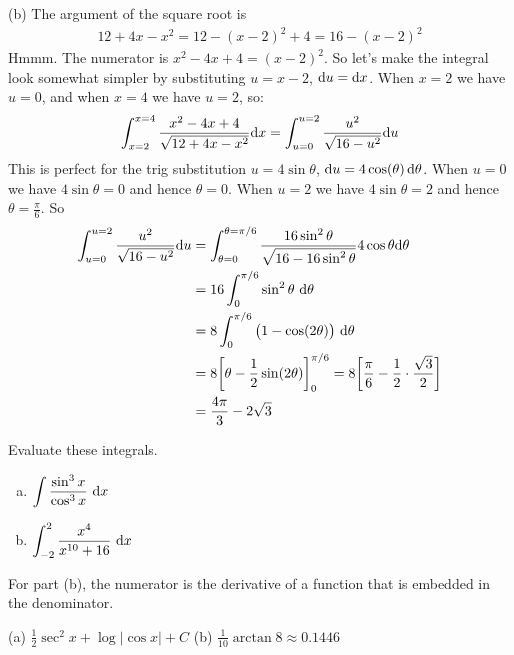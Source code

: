 \begin{solution}
\noindent (b)  The argument of the square root is
\begin{align*}
12+4x-x^2
=12-(x-2)^2 +4
=16-(x-2)^2
\end{align*}
Hmmm. The numerator is $x^2-4x+4=(x-2)^2$. So let's make the integral look somewhat simpler by substituting $u=x-2$, $\mathrm{d}u=\mathrm{d}x$.
When $x=2$ we have $u=0$, and when $x=4$ we have $u=2$, so:
\begin{align*}
\int_{x=2}^{x=4} \frac{x^2-4x+4}{\sqrt{12+4x-x^2}} \mathrm{d}x
=\int_{u=0}^{u=2} \frac{u^2}{\sqrt{16-u^2}} \mathrm{d}u
\end{align*}
This is perfect for the trig substitution $u=4\sin\theta$,
$\mathrm{d}u = 4\cos(\theta)\,\mathrm{d}\theta$. When $u=0$ we have $4\sin\theta = 0$
and hence $\theta=0$. When $u=2$ we have $4\sin\theta = 2$
and hence $\theta=\frac{\pi}{6}$. So
\begin{align*}
\int_{u=0}^{u=2} \frac{u^2}{\sqrt{16-u^2}} \mathrm{d}u
&=\int_{\theta=0}^{\theta=\pi/6}
      \frac{16\sin^2\theta}{\sqrt{16-16\sin^2\theta}}
              4\cos\theta\mathrm{d}\theta \\
&=16\int_{0}^{\pi/6} \sin^2\theta\ \mathrm{d}\theta \\
&=8\int_{0}^{\pi/6} \big(1-\cos(2\theta)\big)\ \mathrm{d}\theta \\
&=8 \bigg[\theta-\frac{1}{2}\sin(2\theta)\bigg]_{0}^{\pi/6}
 =8 \bigg[\frac{\pi}{6}-\frac{1}{2}\cdot \frac{\sqrt{3}}{2} \bigg] \\
& = \frac{4\pi}{3}-2\sqrt{3}
\end{align*}


\end{solution}

\begin{question}[M121 1999A]
Evaluate these integrals.

\begin{enumerate}[(a)]
\item
$\displaystyle\int\frac{\sin^3x}{\cos^3x} \ \dee{x}$
\item
$\displaystyle\int_{-2}^{2}\frac{x^4}{x^{10}+16}\ \dee{x}$
\end{enumerate}
\end{question}

\begin{hint}
For part (b), the numerator is the derivative of a function that is
embedded in the denominator.

\end{hint}

\begin{answer} (a)
$\displaystyle\frac{1}{2}\sec^2 x+\log|\cos x|+C$
\qquad (b)
$\displaystyle \frac{1}{10}\arctan 8\approx 0.1446$
\end{answer}

